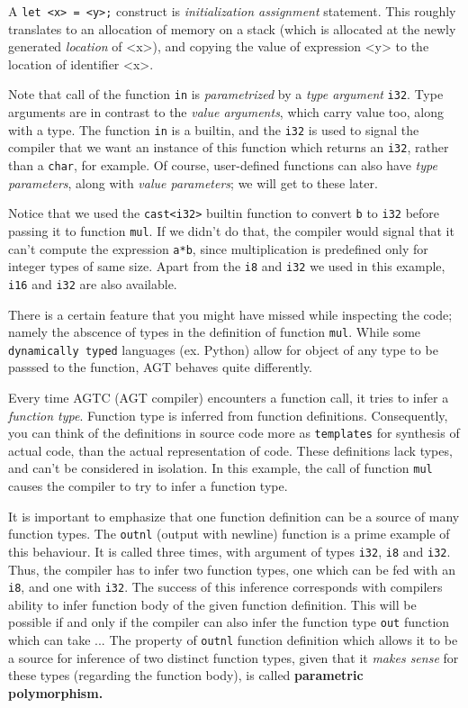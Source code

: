 \documentclass[times, utf8, diplomski]{fer}
\begin{document}
A \texttt{let <x> = <y>;} construct is \textit{initialization assignment} statement.
This roughly translates to an allocation of memory on a stack (which is allocated at the newly
generated \textit{location} of <x>), and copying the value of expression <y>
to the location of identifier <x>.

Note that call of the function \texttt{in} is \textit{parametrized} by a \textit{type argument} \texttt{i32}.
Type arguments are in contrast to the \textit{value arguments}, which carry value too, along with a type.
The function \texttt{in} is a builtin, and the \texttt{i32} is used to signal the compiler
that we want an instance of this function which returns an \texttt{i32}, 
rather than a \texttt{char}, for example. 
Of course, user-defined functions can also have \textit{type parameters}, along with \textit{value parameters};
we will get to these later.

Notice that we used the \texttt{cast<i32>} builtin function to convert \texttt{b} to \texttt{i32}
before passing it to function \texttt{mul}. If we didn't do that, the compiler would signal that it can't
compute the expression \texttt{a*b}, since multiplication is predefined only for integer types of same size.
Apart from the \texttt{i8} and \texttt{i32} we used in this example, \texttt{i16} and \texttt{i32} are also
available.

There is a certain feature that you might have missed while inspecting the code; namely the abscence of
types in the definition of function \texttt{mul}.
While some \texttt{dynamically typed} languages (ex. Python) allow for object of any type to be passsed
to the function, AGT behaves quite differently. 

Every time AGTC (AGT compiler) encounters a function call,
it tries to infer a \textit{function type}. Function type is inferred from function definitions. 
Consequently, you can think of the definitions in source code more as \texttt{templates} for synthesis
of actual code, than the actual representation of code. 
These definitions lack types, and can't be considered in isolation.
In this example, the call of function \texttt{mul} causes the compiler to try to infer a function type.

It is important to emphasize that one function definition can be a source of many function types.
The \texttt{outnl} (output with newline) function is a prime example of this behaviour.
It is called three times, with argument of types \texttt{i32}, \texttt{i8} and \texttt{i32}.
Thus, the compiler has to infer two function types, 
one which can be fed with an \texttt{i8}, and one with \texttt{i32}.
The success of this inference corresponds with compilers ability to infer function body of
the given function definition.
This will be possible if and only if the compiler can also infer the function type \texttt{out} 
function which can take ...
The property of \texttt{outnl} function definition which allows it to be a source for inference
of two distinct function types, given that it \textit{makes sense} for these types 
(regarding the function body), is called \bf{parametric polymorphism}.
\end{document}
